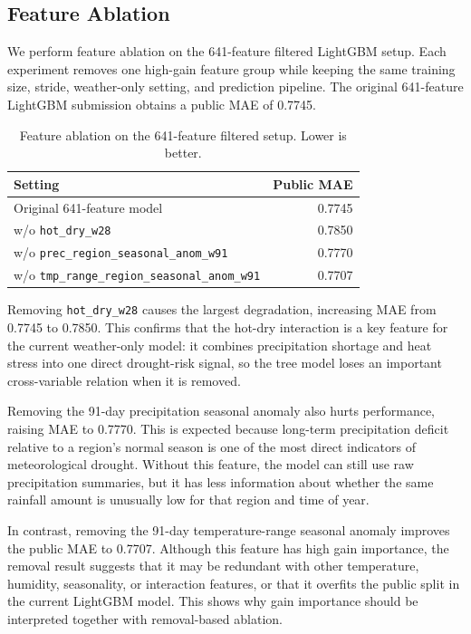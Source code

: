 \documentclass[conference]{IEEEtran}
\begin{document}
\subsection{Feature Ablation}

We perform feature ablation on the 641-feature filtered LightGBM setup. Each
experiment removes one high-gain feature group while keeping the same training
size, stride, weather-only setting, and prediction pipeline. The original
641-feature LightGBM submission obtains a public MAE of 0.7745.

\begin{table}[t]
\centering
\caption{Feature ablation on the 641-feature filtered setup. Lower is better.}
\label{tab:feature_ablation}
\begin{tabular}{p{}r}
\toprule
\renewcommand{\arraystretch}{1.3}
Setting & Public MAE \\
\midrule
Original 641-feature model & 0.7745 \\
\addlinespace
w/o \texttt{hot\_dry\_w28} & 0.7850 \\
\addlinespace
w/o \texttt{prec\_region\_}\newline\texttt{seasonal\_anom\_w91} & 0.7770 \\
\addlinespace
w/o \texttt{tmp\_range\_region\_}\newline\texttt{seasonal\_anom\_w91} & 0.7707 \\
\bottomrule
\end{tabular}
\end{table}

Removing \texttt{hot\_dry\_w28} causes the largest degradation, increasing MAE
from 0.7745 to 0.7850. This confirms that the hot-dry interaction is a key
feature for the current weather-only model: it combines precipitation shortage
and heat stress into one direct drought-risk signal, so the tree model loses an
important cross-variable relation when it is removed.

Removing the 91-day precipitation seasonal anomaly also hurts performance,
raising MAE to 0.7770. This is expected because long-term precipitation deficit
relative to a region's normal season is one of the most direct indicators of
meteorological drought. Without this feature, the model can still use raw
precipitation summaries, but it has less information about whether the same
rainfall amount is unusually low for that region and time of year.

In contrast, removing the 91-day temperature-range seasonal anomaly improves
the public MAE to 0.7707. Although this feature has high gain importance, the
removal result suggests that it may be redundant with other temperature,
humidity, seasonality, or interaction features, or that it overfits the public
split in the current LightGBM model. This shows why gain importance should be
interpreted together with removal-based ablation.
\end{document}
